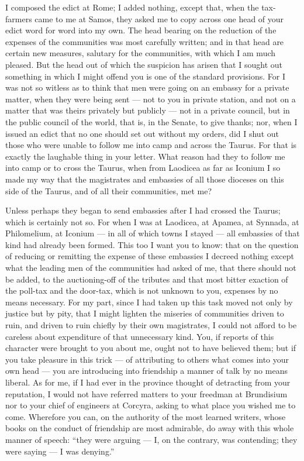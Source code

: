  I composed the edict at Rome; I added nothing, except that, when the tax-farmers came to me at Samos, they asked me to copy across one head of your edict word for word into my own. The head bearing on the reduction of the expenses of the communities was most carefully written; and in that head are certain new measures, salutary for the communities, with which I am much pleased. But the head out of which the suspicion has arisen that I sought out something in which I might offend you is one of the standard provisions. For I was not so witless as to think that men were going on an embassy for a private matter, when they were being sent --- not to you in private station, and not on a matter that was theirs privately but publicly --- not in a private council, but in the public council of the world, that is, in the Senate, to give thanks; nor, when I issued an edict that no one should set out without my orders, did I shut out those who were unable to follow me into camp and across the Taurus. For that is exactly the laughable thing in your letter. What reason had they to follow me into camp or to cross the Taurus, when from Laodicea as far as Iconium I so made my way that the magistrates and embassies of all those dioceses on this side of the Taurus, and of all their communities, met me?

 Unless perhaps they began to send embassies after I had crossed the Taurus; which is certainly not so. For when I was at Laodicea, at Apamea, at Synnada, at Philomelium, at Iconium --- in all of which towns I stayed --- all embassies of that kind had already been formed. This too I want you to know: that on the question of reducing or remitting the expense of these embassies I decreed nothing except what the leading men of the communities had asked of me, that there should not be added, to the auctioning-off of the tributes and that most bitter exaction of the poll-tax and the door-tax, which is not unknown to you, expenses by no means necessary. For my part, since I had taken up this task moved not only by justice but by pity, that I might lighten the miseries of communities driven to ruin, and driven to ruin chiefly by their own magistrates, I could not afford to be careless about expenditure of that unnecessary kind. You, if reports of this character were brought to you about me, ought not to have believed them; but if you take pleasure in this trick --- of attributing to others what comes into your own head --- you are introducing into friendship a manner of talk by no means liberal. As for me, if I had ever in the province thought of detracting from your reputation, I would not have referred matters to your freedman at Brundisium nor to your chief of engineers at Corcyra, asking to what place you wished me to come. Wherefore you can, on the authority of the most learned writers, whose books on the conduct of friendship are most admirable, do away with this whole manner of speech: ``they were arguing --- I, on the contrary, was contending; they were saying --- I was denying.''

